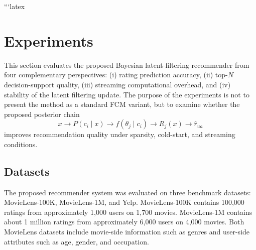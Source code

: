 \documentclass{article}
\theoremstyle{plain}
\theoremstyle{definition}
\theoremstyle{remark}
\begin{document}






























```latex
\section{Experiments}
\label{sec:experiments}

This section evaluates the proposed Bayesian latent-filtering recommender from four complementary perspectives:
(i) rating prediction accuracy, (ii) top-\(N\) decision-support quality, (iii) streaming computational overhead, and (iv) stability of the latent filtering update. The purpose of the experiments is not to present the method as a standard FCM variant, but to examine whether the proposed posterior chain
\[
x
\longrightarrow
P(c_i\mid x)
\longrightarrow
f(\theta_j\mid c_i)
\longrightarrow
R_j(x)
\longrightarrow
\widehat r_{ua}
\]
improves recommendation quality under sparsity, cold-start, and streaming conditions.

\subsection{Datasets}
\label{subsec:datasets}

The proposed recommender system was evaluated on three benchmark datasets: MovieLens-100K, MovieLens-1M, and Yelp. MovieLens-100K contains 100,000 ratings from approximately 1,000 users on 1,700 movies. MovieLens-1M contains about 1 million ratings from approximately 6,000 users on 4,000 movies. Both MovieLens datasets include movie-side information such as genres and user-side attributes such as age, gender, and occupation.
\end{document}
